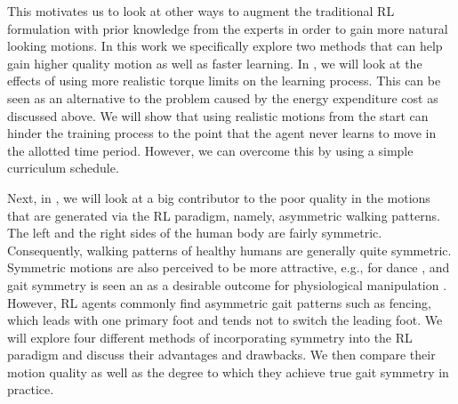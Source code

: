 This motivates us to look at other ways to augment the traditional \ac{RL} formulation with prior knowledge from the experts in order to gain more natural looking motions. In this work we specifically explore two methods that can help gain higher quality motion as well as faster learning. In , we will look at the effects of using more realistic torque limits on the learning process. This can be seen as an alternative to the problem caused by the energy expenditure cost as discussed above. We will show that using realistic motions from the start can hinder the training process to the point that the agent never learns to move in the allotted time period. However, we can overcome this by using a simple curriculum schedule.

Next, in , we will look at a big contributor to the poor quality in the motions that are generated via the \ac{RL} paradigm, namely, asymmetric walking patterns. The left and the right sides of the human body are fairly symmetric. Consequently, walking patterns of healthy humans are generally quite symmetric. Symmetric motions are also perceived to be more attractive, e.g., for dance \cite{danceSymmetry}, and gait symmetry is seen an as a desirable outcome for physiological manipulation \cite{robinson1987use}. However, \ac{RL} agents commonly find asymmetric gait patterns such as fencing, which leads with one primary foot and tends not to switch the leading foot. We will explore four different methods of incorporating symmetry into the \ac{RL} paradigm and discuss their advantages and drawbacks. We then compare their motion quality as well as the degree to which they achieve true gait symmetry in practice.